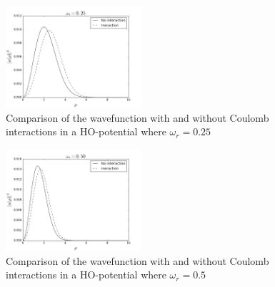 \documentclass[twoside,twocolumn]{article}
\begin{document}
	\begin{figure}[p]
		\includegraphics[width=0.45\textwidth]{../report/figures/freq025.png} 
		\caption{Comparison of the wavefunction with and without Coulomb interactions in a HO-potential where $\omega_r=0.25$}\label{fig:fq025}
	\end{figure}
	\begin{figure}[p]
		\includegraphics[width=0.45\textwidth]{../report/figures/freq050.png} 
		\caption{Comparison of the wavefunction with and without Coulomb interactions in a HO-potential where $\omega_r=0.5$}\label{fig:fq050}
	\end{figure}
	
\end{document}
